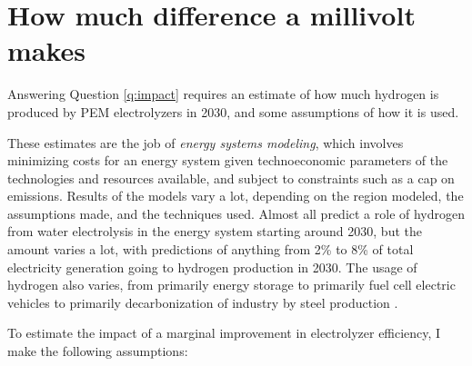 
\section{How much difference a millivolt makes}

Answering Question \ref{q:impact} requires an estimate of how much hydrogen is produced by PEM electrolyzers in 2030, and some assumptions of how it is used.

These estimates are the job of \textit{energy systems modeling}, which involves minimizing costs for an energy system given technoeconomic parameters of the technologies and resources available, and subject to constraints such as a cap on  emissions\cite{Storgaard2019_MSc}. Results of the models vary a lot, depending on the region modeled, the assumptions made, and the techniques used. Almost all predict a role of hydrogen from water electrolysis in the energy system starting around 2030, but the amount varies a lot, with predictions of anything from 2\% to 8\% of total electricity generation going to hydrogen production in 2030. The usage of hydrogen also varies, from primarily energy storage\cite{Budischak2013, Storgaard2019_MSc, Jacobson2018} to primarily fuel cell electric vehicles\cite{Meibom2010} to primarily decarbonization of industry by steel production \cite{Sgobbi2016}. 

To estimate the impact of a marginal improvement in electrolyzer efficiency, I make the following assumptions:

